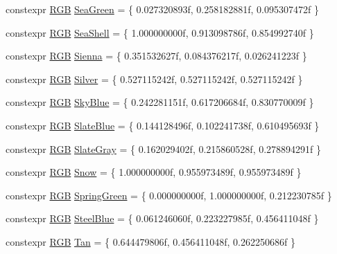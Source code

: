 \begin{DoxyCompactItemize}
\item 
constexpr \mbox{\hyperlink{structmage_1_1_r_g_b}{R\+GB}} \mbox{\hyperlink{namespacemage_1_1color_a20147160d6224370ec0022225c7b1b3f}{Sea\+Green}} = \{ 0.\+027320893f, 0.\+258182881f, 0.\+095307472f \}
\item 
constexpr \mbox{\hyperlink{structmage_1_1_r_g_b}{R\+GB}} \mbox{\hyperlink{namespacemage_1_1color_aa47be4b4b7553ee872d5593ce4312249}{Sea\+Shell}} = \{ 1.\+000000000f, 0.\+913098786f, 0.\+854992740f \}
\item 
constexpr \mbox{\hyperlink{structmage_1_1_r_g_b}{R\+GB}} \mbox{\hyperlink{namespacemage_1_1color_a5a0af07311915c908bfec906f104ce21}{Sienna}} = \{ 0.\+351532627f, 0.\+084376217f, 0.\+026241223f \}
\item 
constexpr \mbox{\hyperlink{structmage_1_1_r_g_b}{R\+GB}} \mbox{\hyperlink{namespacemage_1_1color_a3096a544f2ff01351f010eb5f36f27fa}{Silver}} = \{ 0.\+527115242f, 0.\+527115242f, 0.\+527115242f \}
\item 
constexpr \mbox{\hyperlink{structmage_1_1_r_g_b}{R\+GB}} \mbox{\hyperlink{namespacemage_1_1color_a339e4398bfd1cb4ac82f65578c9cfd1d}{Sky\+Blue}} = \{ 0.\+242281151f, 0.\+617206684f, 0.\+830770009f \}
\item 
constexpr \mbox{\hyperlink{structmage_1_1_r_g_b}{R\+GB}} \mbox{\hyperlink{namespacemage_1_1color_a0050809618b8a86850ccfee8b48e3d71}{Slate\+Blue}} = \{ 0.\+144128496f, 0.\+102241738f, 0.\+610495693f \}
\item 
constexpr \mbox{\hyperlink{structmage_1_1_r_g_b}{R\+GB}} \mbox{\hyperlink{namespacemage_1_1color_a1553763ab8b4309ffb51fc4f48ed2a12}{Slate\+Gray}} = \{ 0.\+162029402f, 0.\+215860528f, 0.\+278894291f \}
\item 
constexpr \mbox{\hyperlink{structmage_1_1_r_g_b}{R\+GB}} \mbox{\hyperlink{namespacemage_1_1color_aab49681d71304f41e6c9606093ab5b95}{Snow}} = \{ 1.\+000000000f, 0.\+955973489f, 0.\+955973489f \}
\item 
constexpr \mbox{\hyperlink{structmage_1_1_r_g_b}{R\+GB}} \mbox{\hyperlink{namespacemage_1_1color_acb2eb0c5c4be0356ad6614ff63c36738}{Spring\+Green}} = \{ 0.\+000000000f, 1.\+000000000f, 0.\+212230785f \}
\item 
constexpr \mbox{\hyperlink{structmage_1_1_r_g_b}{R\+GB}} \mbox{\hyperlink{namespacemage_1_1color_a2a4b03e450e79d03ce4e6061d54ad671}{Steel\+Blue}} = \{ 0.\+061246060f, 0.\+223227985f, 0.\+456411048f \}
\item 
constexpr \mbox{\hyperlink{structmage_1_1_r_g_b}{R\+GB}} \mbox{\hyperlink{namespacemage_1_1color_a1a70b829eefc1b4686d328747e4c712d}{Tan}} = \{ 0.\+644479806f, 0.\+456411048f, 0.\+262250686f \}

\end{DoxyCompactItemize}
